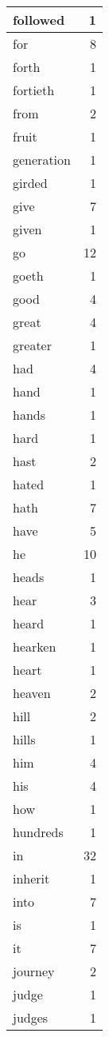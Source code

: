 \begin{center}
\begin{longtable}{l|r}
followed & 1 \\ \hline
for & 8 \\ \hline
forth & 1 \\ \hline
fortieth & 1 \\ \hline
from & 2 \\ \hline
fruit & 1 \\ \hline
generation & 1 \\ \hline
girded & 1 \\ \hline
give & 7 \\ \hline
given & 1 \\ \hline
go & 12 \\ \hline
goeth & 1 \\ \hline
good & 4 \\ \hline
great & 4 \\ \hline
greater & 1 \\ \hline
had & 4 \\ \hline
hand & 1 \\ \hline
hands & 1 \\ \hline
hard & 1 \\ \hline
hast & 2 \\ \hline
hated & 1 \\ \hline
hath & 7 \\ \hline
have & 5 \\ \hline
he & 10 \\ \hline
heads & 1 \\ \hline
hear & 3 \\ \hline
heard & 1 \\ \hline
hearken & 1 \\ \hline
heart & 1 \\ \hline
heaven & 2 \\ \hline
hill & 2 \\ \hline
hills & 1 \\ \hline
him & 4 \\ \hline
his & 4 \\ \hline
how & 1 \\ \hline
hundreds & 1 \\ \hline
in & 32 \\ \hline
inherit & 1 \\ \hline
into & 7 \\ \hline
is & 1 \\ \hline
it & 7 \\ \hline
journey & 2 \\ \hline
judge & 1 \\ \hline
judges & 1 \\ \hline

\end{longtable}
\end{center}

